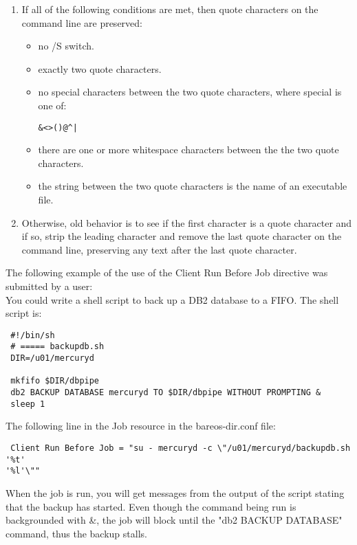 \begin{description}
\begin{enumerate}
\item
If all of the following conditions are met, then quote characters
on the command line are preserved:
\begin{itemize}
\item no /S switch.
\item exactly two quote characters.
\item no special characters between the two quote characters,
where special is one of:
\begin{verbatim}
&<>()@^|
\end{verbatim}
\item there are one or more whitespace characters between the
the two quote characters.
\item the string between the two quote characters is the name
of an executable file.
\end{itemize}

\item  Otherwise, old behavior is to see if the first character is
a quote character and if so, strip the leading character and
remove the last quote character on the command line, preserving
any text after the last quote character.
\end{enumerate}

The following example of the use of the Client Run Before Job directive was
submitted by a user:\\
You could write a shell script to back up a DB2 database to a FIFO. The shell
script is:

\footnotesize
\begin{verbatim}
 #!/bin/sh
 # ===== backupdb.sh
 DIR=/u01/mercuryd

 mkfifo $DIR/dbpipe
 db2 BACKUP DATABASE mercuryd TO $DIR/dbpipe WITHOUT PROMPTING &
 sleep 1
\end{verbatim}
\normalsize

The following line in the Job resource in the bareos-dir.conf file:
\footnotesize
\begin{verbatim}
 Client Run Before Job = "su - mercuryd -c \"/u01/mercuryd/backupdb.sh '%t'
'%l'\""
\end{verbatim}
\normalsize

When the job is run, you will get messages from the output of the script
stating that the backup has started. Even though the command being run is
backgrounded with \&, the job will block until the "db2 BACKUP DATABASE"
command, thus the backup stalls.


\end{description}
